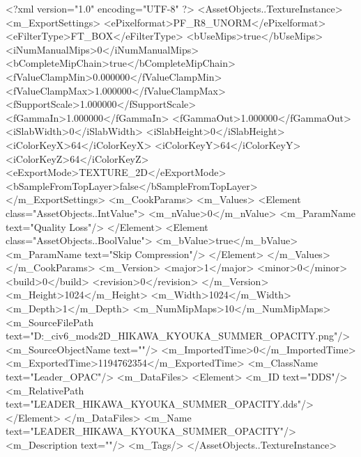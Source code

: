 <?xml version="1.0" encoding="UTF-8" ?>
<AssetObjects..TextureInstance>
	<m_ExportSettings>
		<ePixelformat>PF_R8_UNORM</ePixelformat>
		<eFilterType>FT_BOX</eFilterType>
		<bUseMips>true</bUseMips>
		<iNumManualMips>0</iNumManualMips>
		<bCompleteMipChain>true</bCompleteMipChain>
		<fValueClampMin>0.000000</fValueClampMin>
		<fValueClampMax>1.000000</fValueClampMax>
		<fSupportScale>1.000000</fSupportScale>
		<fGammaIn>1.000000</fGammaIn>
		<fGammaOut>1.000000</fGammaOut>
		<iSlabWidth>0</iSlabWidth>
		<iSlabHeight>0</iSlabHeight>
		<iColorKeyX>64</iColorKeyX>
		<iColorKeyY>64</iColorKeyY>
		<iColorKeyZ>64</iColorKeyZ>
		<eExportMode>TEXTURE_2D</eExportMode>
		<bSampleFromTopLayer>false</bSampleFromTopLayer>
	</m_ExportSettings>
	<m_CookParams>
		<m_Values>
			<Element class="AssetObjects..IntValue">
				<m_nValue>0</m_nValue>
				<m_ParamName text="Quality Loss"/>
			</Element>
			<Element class="AssetObjects..BoolValue">
				<m_bValue>true</m_bValue>
				<m_ParamName text="Skip Compression"/>
			</Element>
		</m_Values>
	</m_CookParams>
	<m_Version>
		<major>1</major>
		<minor>0</minor>
		<build>0</build>
		<revision>0</revision>
	</m_Version>
	<m_Height>1024</m_Height>
	<m_Width>1024</m_Width>
	<m_Depth>1</m_Depth>
	<m_NumMipMaps>10</m_NumMipMaps>
	<m_SourceFilePath text="D:\Documents\GitHub\Uzuki_civ6_mods\LandsolPrinFes\Texture2D\LEADER_HIKAWA_KYOUKA_SUMMER_OPACITY.png"/>
	<m_SourceObjectName text=""/>
	<m_ImportedTime>0</m_ImportedTime>
	<m_ExportedTime>1194762354</m_ExportedTime>
	<m_ClassName text="Leader_OPAC"/>
	<m_DataFiles>
		<Element>
			<m_ID text="DDS"/>
			<m_RelativePath text="LEADER_HIKAWA_KYOUKA_SUMMER_OPACITY.dds"/>
		</Element>
	</m_DataFiles>
	<m_Name text="LEADER_HIKAWA_KYOUKA_SUMMER_OPACITY"/>
	<m_Description text=""/>
	<m_Tags/>
</AssetObjects..TextureInstance>

